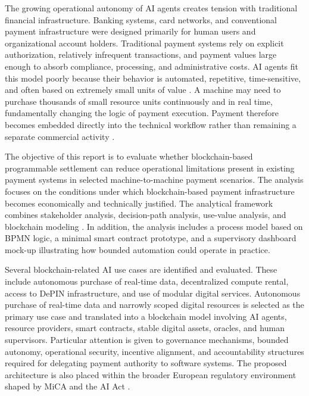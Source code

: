 \documentclass[12pt,a4paper,oneside]{article}
\theoremstyle{definition}
\theoremstyle{plain}
\begin{document}
The growing operational autonomy of AI agents creates tension with traditional financial infrastructure. Banking systems, card networks, and conventional payment infrastructure were designed primarily for human users and organizational account holders. Traditional payment systems rely on explicit authorization, relatively infrequent transactions, and payment values large enough to absorb compliance, processing, and administrative costs. AI agents fit this model poorly because their behavior is automated, repetitive, time-sensitive, and often based on extremely small units of value \citep{mougayar2016}. A machine may need to purchase thousands of small resource units continuously and in real time, fundamentally changing the logic of payment execution. Payment therefore becomes embedded directly into the technical workflow rather than remaining a separate commercial activity \citep{krueger2026workshop2,krueger2026workshop3}.

The objective of this report is to evaluate whether blockchain-based programmable settlement can reduce operational limitations present in existing payment systems in selected machine-to-machine payment scenarios. The analysis focuses on the conditions under which blockchain-based payment infrastructure becomes economically and technically justified. The analytical framework combines stakeholder analysis, decision-path analysis, use-value analysis, and blockchain modeling \citep{krueger2026workshop1,krueger2026workshop3,krueger2026workshop5,krueger2026workshop7a,krueger2026workshop7b}. In addition, the analysis includes a process model based on BPMN logic, a minimal smart contract prototype, and a supervisory dashboard mock-up illustrating how bounded automation could operate in practice.

Several blockchain-related AI use cases are identified and evaluated. These include autonomous purchase of real-time data, decentralized compute rental, access to DePIN infrastructure, and use of modular digital services. Autonomous purchase of real-time data and narrowly scoped digital resources is selected as the primary use case and translated into a blockchain model involving AI agents, resource providers, smart contracts, stable digital assets, oracles, and human supervisors. Particular attention is given to governance mechanisms, bounded autonomy, operational security, incentive alignment, and accountability structures required for delegating payment authority to software systems. The proposed architecture is also placed within the broader European regulatory environment shaped by MiCA and the AI Act \citep{europeanparliament2023mica,europeanunion2024aiact}. 
\end{document}
